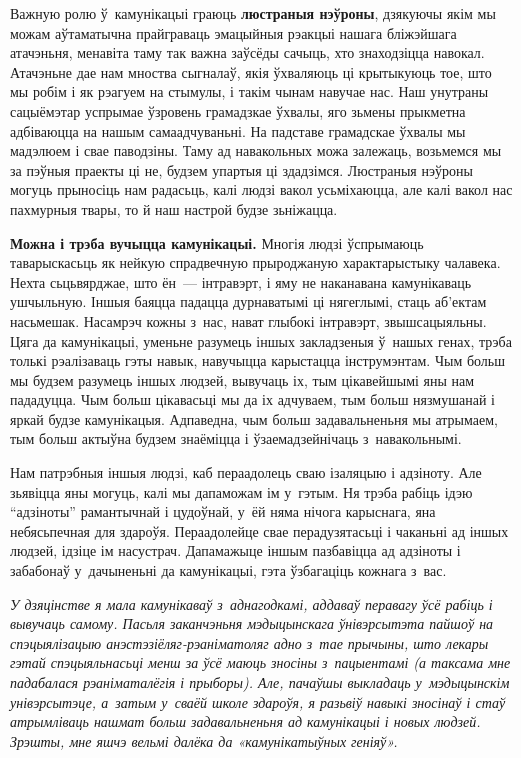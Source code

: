 Важную ролю ў~камунікацыі граюць \textbf{люстраныя нэўроны}, дзякуючы якім мы можам аўтаматычна прайграваць эмацыйныя рэакцыі нашага бліжэйшага атачэньня, менавіта таму так важна заўсёды сачыць, хто знаходзіцца навокал. Атачэньне дае нам мноства сыгналаў, якія ўхваляюць ці крытыкуюць тое, што мы робім і як рэагуем на стымулы, і такім чынам навучае нас. Наш унутраны сацыёмэтар успрымае ўзровень грамадзкае ўхвалы, яго зьмены прыкметна адбіваюцца на нашым самаадчуваньні. На падставе грамадскае ўхвалы мы мадэлюем і свае паводзіны. Таму ад навакольных можа залежаць, возьмемся мы за пэўныя праекты ці не, будзем упартыя ці здадзімся. Люстраныя нэўроны могуць прыносіць нам радасьць, калі людзі вакол усьміхаюцца, але калі вакол нас пахмурныя твары, то й наш настрой будзе зьніжацца.

\textbf{Можна і трэба вучыцца камунікацыі.} Многія людзі ўспрымаюць таварыскасьць як нейкую спрадвечную прыроджаную характарыстыку чалавека. Нехта сьцьвярджае, што ён~--- інтравэрт, і яму не наканавана камунікаваць ушчыльную. Іншыя баяцца падацца дурнаватымі ці нягеглымі, стаць аб'ектам насьмешак. Насамрэч кожны з~нас, нават глыбокі інтравэрт, звышсацыяльны. Цяга да камунікацыі, уменьне разумець іншых закладзеныя ў~нашых генах, трэба толькі рэалізаваць гэты навык, навучыцца карыстацца інструмэнтам. Чым больш мы будзем разумець іншых людзей, вывучаць іх, тым цікавейшымі яны нам пададуцца. Чым больш цікавасьці мы да іх адчуваем, тым больш нязмушанай і яркай будзе камунікацыя. Адпаведна, чым больш задавальненьня мы атрымаем, тым больш актыўна будзем знаёміцца і ўзаемадзейнічаць з~навакольнымі.

Нам патрэбныя іншыя людзі, каб пераадолець сваю ізаляцыю і адзіноту. Але зьявіцца яны могуць, калі мы дапаможам ім у~гэтым. Ня трэба рабіць ідэю ``адзіноты'' рамантычнай і цудоўнай, у~ёй няма нічога карыснага, яна небясьпечная для здароўя. Пераадолейце свае перадузятасьці і чаканьні ад іншых людзей, ідзіце ім насустрач. Дапамажыце іншым пазбавіцца ад адзіноты і забабонаў у~дачыненьні да камунікацыі, гэта ўзбагаціць кожнага з~вас.

\emph{У дзяцінстве я мала камунікаваў з~аднагодкамі, аддаваў перавагу ўсё рабіць і вывучаць самому. Пасьля заканчэньня мэдыцынскага ўнівэрсытэта пайшоў на спэцыялізацыю анэстэзіёляг-рэаніматоляг адно з~тае прычыны, што лекары гэтай спэцыяльнасьці менш за ўсё маюць зносіны з~пацыентамі (а таксама мне падабалася рэаніматалёгія і прыборы). Але, пачаўшы выкладаць у~мэдыцынскім унівэрсытэце, а~затым у~сваёй школе здароўя, я разьвіў навыкі зносінаў і стаў атрымліваць нашмат больш задавальненьня ад камунікацыі і новых людзей. Зрэшты, мне яшчэ вельмі далёка да «камунікатыўных геніяў».}

